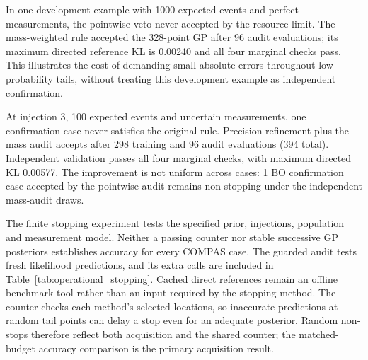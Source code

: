 In one development example with 1000 expected events and perfect measurements,
the pointwise veto never accepted by the resource limit. The mass-weighted rule
accepted the 328-point GP after 96 audit evaluations; its maximum directed
reference KL is 0.00240 and all four marginal checks pass. This illustrates the
cost of demanding small absolute errors throughout low-probability tails,
without treating this development example as independent confirmation.

At injection 3, 100 expected events and uncertain measurements, one confirmation case never satisfies the original rule. Precision refinement plus the mass audit accepts after 298 training and 96 audit evaluations (394 total). Independent validation passes all four marginal checks, with maximum directed KL 0.00577.
The improvement is not uniform across cases: 1 BO confirmation case accepted by the pointwise audit remains non-stopping under the independent mass-audit draws.

The finite stopping experiment tests the specified prior, injections, population
and measurement model. Neither a passing counter nor stable successive GP
posteriors establishes accuracy for every COMPAS case. The guarded audit tests
fresh likelihood predictions, and its extra calls are included in
Table~\ref{tab:operational_stopping}. Cached direct references remain an offline
benchmark tool rather than an input required by the stopping method.
The counter checks each method's selected locations, so inaccurate predictions
at random tail points can delay a stop even for an adequate posterior.
Random non-stops therefore reflect both acquisition and the shared counter;
the matched-budget accuracy comparison is the primary acquisition result.
